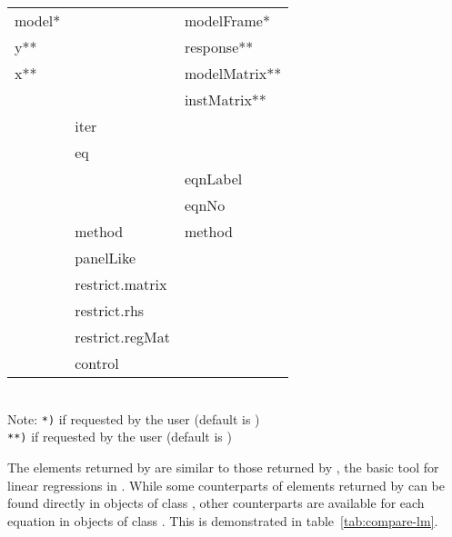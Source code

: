 \begin{table}[htbp]
{\begin{tabular}{lll}
model*          &                & modelFrame* \\
y**             &                & response** \\
x**             &                & modelMatrix** \\
                &                & instMatrix** \\
                & iter           & \\
                & eq             & \\
                &                & eqnLabel \\
                &                & eqnNo \\
                & method         & method \\
                & panelLike      & \\
                & restrict.matrix& \\
                & restrict.rhs   & \\
                & restrict.regMat& \\
                & control        & \\
\hline  \hline
\end{tabular}
}
\medskip\\
Note:
\texttt{*)} if requested by the user (default is )\\
\texttt{**)} if requested by the user (default is )
\end{table}


The elements returned by 
are similar to those returned by ,
the basic tool for linear regressions in .
While some counterparts of elements returned by 
can be found directly in objects of class ,
other counterparts are available for each equation
in objects of class .
This is demonstrated in table~\ref{tab:compare-lm}.
